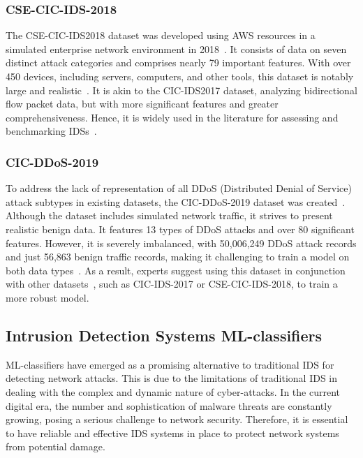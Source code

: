 \subsubsection{CSE-CIC-IDS-2018}
The CSE-CIC-IDS2018 dataset was developed using AWS resources in a simulated enterprise network environment in
2018~\cite{CSE-CIC-IDS2018}.
It consists of data on seven distinct attack categories and comprises nearly 79 important features.
With over 450 devices, including servers, computers, and other tools, this dataset is notably large and
realistic~\cite{pujari2022comparative}.
It is akin to the CIC-IDS2017 dataset, analyzing bidirectional flow packet data, but with more significant features and
greater comprehensiveness.
Hence, it is widely used in the literature for assessing and benchmarking IDSs~\cite{pujari2022comparative}.

\subsubsection{CIC-DDoS-2019}
To address the lack of representation of all DDoS (Distributed Denial of Service) attack subtypes in existing datasets,
the CIC-DDoS-2019 dataset was created~\cite{CICDDoS2019}.
Although the dataset includes simulated network traffic, it strives to present realistic benign data.
It features 13 types of DDoS attacks and over 80 significant features.
However, it is severely imbalanced, with 50,006,249 DDoS attack records and just 56,863 benign traffic records, making
it challenging to train a model on both data types~\cite{RING2019147}.
As a result, experts suggest using this dataset in conjunction with other datasets~\cite{Shroff2022}, such as
CIC-IDS-2017 or CSE-CIC-IDS-2018, to train a more robust model.


\subsection{Intrusion Detection Systems ML-classifiers}\label{subsec:intrusion-detection-systems-classifiers}
ML-classifiers have emerged as a promising alternative to traditional IDS for detecting network attacks.
This is due to the limitations of traditional IDS in dealing with the complex and dynamic nature of cyber-attacks.
In the current digital era, the number and sophistication of malware threats are constantly growing, posing a serious
challenge to network security.
Therefore, it is essential to have reliable and effective IDS systems in place to protect network systems from
potential damage.

